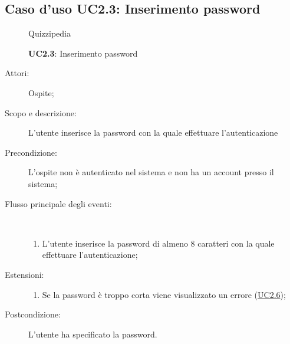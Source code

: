 \subsection{Caso d'uso UC2.3: Inserimento password}
	\begin{figure}[H]
		\centering
		\begin{resizedtikzpicture}{\textwidth}
		\begin{umlsystem}[x=0, fill=lightgray!20]{Quizzipedia}
		\end{umlsystem}
		\end{resizedtikzpicture}
		\caption{\textbf{UC2.3}: Inserimento password}
		\label{UC2.3}
	\end{figure}
\begin{description}
\item[Attori:] Ospite;
\item[Scopo e descrizione:] L'utente inserisce la password con la quale effettuare l'autenticazione
      \item[Precondizione:] L'ospite non è autenticato nel sistema e non ha un account presso il sistema;

        \item[Flusso principale degli eventi:] \ 
 \begin{enumerate}
          \item L'utente inserisce la password di almeno 8 caratteri con la quale effettuare l'autenticazione;

      \end{enumerate}
    \item[Estensioni:]
      \begin{enumerate}
          \item Se la password è troppo corta viene visualizzato un errore	 (\hyperlink{UC2.6}{UC2.6});

      \end{enumerate}
    \item[Postcondizione:] L'utente ha specificato la password.
  \end{description}
\hypertarget{UC2.4}{}
